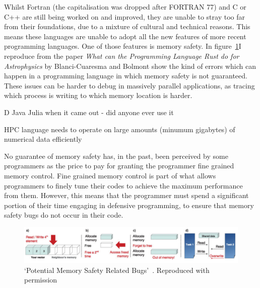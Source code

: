 \documentclass{report}[a4]
\begin{document}
Whilst Fortran (the capitalisation was dropped after FORTRAN 77) and C or C++ are still being worked on and improved, they are unable to stray too far from their foundations, due to a mixture of cultural and technical reasons. This means these languages are unable to adopt all the new features of more recent programming languages. One of those features is memory safety. In figure~\ref{fig:mem}I reproduce from the paper \textit{What can the Programming Language Rust do for Astrophysics} \cite{blanco-cuaresma_bolmont_2016}by Blanci-Cuaresma and Bolmont show the kind of errors which can happen in a programming language in which memory safety is not guaranteed. %
These issues can be harder to debug in massively parallel applications, as tracing which process is writing to which memory location is harder.

D Java Julia when it came out - did anyone ever use it

HPC language needs to operate on large amounts (minumum gigabytes) of numerical data efficiently

No guarantee of memory safety has, in the past, been perceived by some programmers as the price to pay for granting the programmer fine grained memory control. Fine grained memory control is part of what allows programmers to finely tune their codes to achieve the maximum performance from them. However, this means that the programmer must spend a significant portion of their time engaging in defensive programming, to ensure that memory safety bugs do not occur in their code.


\begin{figure}[h]
  \centering
  \includegraphics[width=\linewidth]{figures/memory-safety.png}
  \caption{`Potential Memory Safety Related Bugs'~\cite{blanco-cuaresma_bolmont_2016}. Reproduced with permission}
  \label{fig:mem}
\end{figure}
\end{document}
